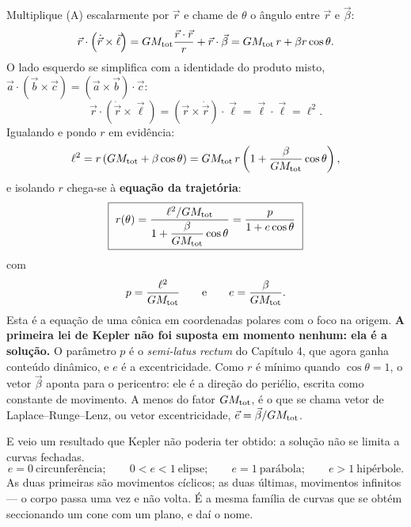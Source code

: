 \documentclass[11pt,a4paper]{article}
\begin{document}
Multiplique (A) escalarmente por $\vec{r}$ e chame de $\theta$ o ângulo entre $\vec{r}$ e $\vec{\beta}$:
\[
\vec{r}\cdot\left(\dot{\vec{r}}\times\vec{\ell}\right)
=GM_{\rm tot}\frac{\vec{r}\cdot\vec{r}}{r}+\vec{r}\cdot\vec{\beta}
=GM_{\rm tot}\,r+\beta r\cos\theta.
\]
O lado esquerdo se simplifica com a identidade do produto misto,
$\vec{a}\cdot(\vec{b}\times\vec{c})=(\vec{a}\times\vec{b})\cdot\vec{c}$:
\[
\vec{r}\cdot\left(\dot{\vec{r}}\times\vec{\ell}\right)
=\left(\vec{r}\times\dot{\vec{r}}\right)\cdot\vec{\ell}
=\vec{\ell}\cdot\vec{\ell}=\ell^{2}.
\]
Igualando e pondo $r$ em evidência:
\[
\ell^{2}=r\left(GM_{\rm tot}+\beta\cos\theta\right)
=GM_{\rm tot}\,r\left(1+\frac{\beta}{GM_{\rm tot}}\cos\theta\right),
\]
e isolando $r$ chega-se à \textbf{equação da trajetória}:
\[
\boxed{\ r(\theta)=\frac{\ell^{2}/GM_{\rm tot}}{1+\dfrac{\beta}{GM_{\rm tot}}\cos\theta}
=\frac{p}{1+e\cos\theta}\ }
\]
com
\[
p=\frac{\ell^{2}}{GM_{\rm tot}}
\qquad\text{e}\qquad
e=\frac{\beta}{GM_{\rm tot}}.
\]
Esta é a equação de uma cônica em coordenadas polares com o foco na origem. \textbf{A primeira lei de Kepler
não foi suposta em momento nenhum: ela é a solução.} O parâmetro $p$ é o \textit{semi-latus rectum} do
Capítulo 4, que agora ganha conteúdo dinâmico, e $e$ é a excentricidade. Como $r$ é mínimo quando
$\cos\theta=1$, o vetor $\vec{\beta}$ aponta para o pericentro: ele é a direção do periélio, escrita como
constante de movimento. A menos do fator $GM_{\rm tot}$, é o que se chama vetor de Laplace--Runge--Lenz, ou
vetor excentricidade, $\vec{e}=\vec{\beta}/GM_{\rm tot}$.

E veio um resultado que Kepler não poderia ter obtido: a solução não se limita a curvas fechadas.
\[
e=0\ \text{circunferência};\qquad
0<e<1\ \text{elipse};\qquad
e=1\ \text{parábola};\qquad
e>1\ \text{hipérbole}.
\]
As duas primeiras são movimentos cíclicos; as duas últimas, movimentos infinitos --- o corpo passa uma vez e
não volta. É a mesma família de curvas que se obtém seccionando um cone com um plano, e daí o nome.
\end{document}
